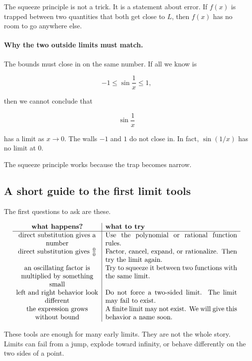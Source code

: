 The squeeze principle is not a trick.  It is a statement about error.  If \(f(x)\) is trapped between two quantities that both get close to \(L\), then \(f(x)\) has no room to go anywhere else.

\paragraph{Why the two outside limits must match.}
The bounds must close in on the same number.  If all we know is

\[
-1\le \sin\frac1x\le1,
\]

then we cannot conclude that

\[
\sin\frac1x
\]

has a limit as \(x\to0\).  The walls \(-1\) and \(1\) do not close in.  In fact, \(\sin(1/x)\) has no limit at \(0\).

The squeeze principle works because the trap becomes narrow.

\subsection{A short guide to the first limit tools}
\label{subsec:first-limit-tools-guide}

The first questions to ask are these.

\[
\begin{array}{>{\centering\arraybackslash}p{0.35\textwidth}|p{0.56\textwidth}}
\textbf{what happens?} & \textbf{what to try} \\ \hline
direct substitution gives a number &
Use the polynomial or rational function rules. \\[4pt]
direct substitution gives \(\frac00\) &
Factor, cancel, expand, or rationalize.  Then try the limit again. \\[4pt]
an oscillating factor is multiplied by something small &
Try to squeeze it between two functions with the same limit. \\[4pt]
left and right behavior look different &
Do not force a two-sided limit.  The limit may fail to exist. \\[4pt]
the expression grows without bound &
A finite limit may not exist.  We will give this behavior a name soon.
\end{array}
\]

These tools are enough for many early limits.  They are not the whole story.  Limits can fail from a jump, explode toward infinity, or behave differently on the two sides of a point.

